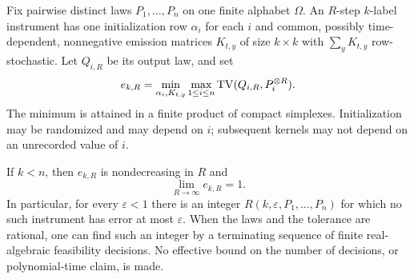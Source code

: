 Fix pairwise distinct laws $P_1,\ldots,P_n$ on one finite alphabet
$\Omega$. An $R$-step $k$-label instrument has one initialization row
$\alpha_i$ for each $i$ and common, possibly time-dependent,
nonnegative emission matrices $K_{t,y}$ of size $k\times k$ with
$\sum_yK_{t,y}$ row-stochastic. Let $Q_{i,R}$ be its output law, and set
\begin{equation}\label{eq:producterror62}
 e_{k,R}=\min_{\alpha_i,K_{t,y}}
             \max_{1\le i\le n}\operatorname{TV}(Q_{i,R},P_i^{\otimes R}).
\end{equation}
The minimum is attained in a finite product of compact simplexes.
Initialization may be randomized and may depend on $i$; subsequent
kernels may not depend on an unrecorded value of $i$.

\begin{proposition}
\label{prop:productconverse62}
If $k<n$, then $e_{k,R}$ is nondecreasing in $R$ and
\begin{equation}\label{eq:productconverse62}
                         \lim_{R\to\infty} e_{k,R}=1.
\end{equation}
In particular, for every $\varepsilon<1$ there is an integer
$R(k,\varepsilon,P_1,\ldots,P_n)$ for which no such instrument has
error at most $\varepsilon$. When the laws and the tolerance are
rational, one can find such an integer by a terminating sequence of
finite real-algebraic feasibility decisions. No effective bound on the
number of decisions, or polynomial-time claim, is made.
\end{proposition}

